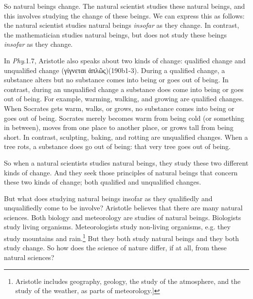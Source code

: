 \documentclass[10pt, oneside]{book}
\newcommand{\greek}[1]{{\selectlanguage{polutonikogreek}#1}}
\begin{document}

So natural beings change. The natural scientist studies these natural beings, and this involves studying the change of these beings. We can express this as follows: the natural scientist studies natural beings \emph{insofar} as they change. In contrast, the mathematician studies natural beings, but does not study these beings \emph{insofar} as they change. 

In \emph{Phy}.1.7, Aristotle also speaks about two kinds of change: qualified change and unqualified change (\greek{γίγνεται ἁπλῶς})(190b1-3).  During a qualified change, a substance alters but no substance comes into being or goes out of being. In contrast, during an unqualified change a substance does come into being or goes out of being. For example, warming, walking, and growing are qualified changes. When Socrates gets warm, walks, or grows, no substance comes into being or goes out of being. Socrates merely becomes warm from being cold (or something in between), moves from one place to another place, or grows tall from being short. In contrast, sculpting, baking, and rotting are unqualified changes. When a tree rots, a substance does go out of being: that very tree goes out of being.

So when a natural scientists studies natural beings, they study these two different kinds of change. And they seek those principles of natural beings that concern these two kinds of change;  both qualified and unqualified changes.

But what does studying natural beings insofar as they qualifiedly and unqualifiedly come to be involve? Aristotle believes that there are many natural sciences. Both biology and meteorology are studies of natural beings. Biologists study living organisms. Meteorologists study non-living organisms, e.g. they study mountains and rain.\footnote{Aristotle includes geography, geology, the study of the atmosphere, and the study of the weather, as parts of meteorology.]} But they both study natural beings and they both study change. So how does the science of nature differ, if at all, from these natural sciences? 
\end{document}
